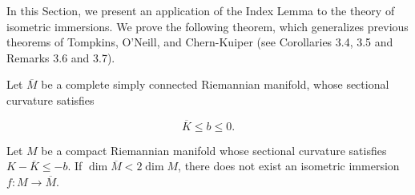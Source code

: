In this Section, we present an application of the Index Lemma to the theory of
isometric immersions. We prove the following theorem, which generalizes previous
theorems of Tompkins, O'Neill, and Chern-Kuiper (see Corollaries 3.4, 3.5 and
Remarks 3.6 and 3.7).

\begin{theorem}[J.D. Moore]
  \label{thm:dc-ch10-3-1}
  Let $\overline{M}$ be a complete simply connected Riemannian manifold, whose
  sectional curvature satisfies
  
  $$
  \overline{K}\leq b\leq 0.
  $$
  
  Let $M$ be a compact Riemannian manifold whose sectional curvature satisfies
  $K-\overline{K}\leq -b$. If $\dim\overline{M}<2\dim M$, there does not exist an
  isometric immersion $f:M\to\overline{M}$.
\end{theorem}
